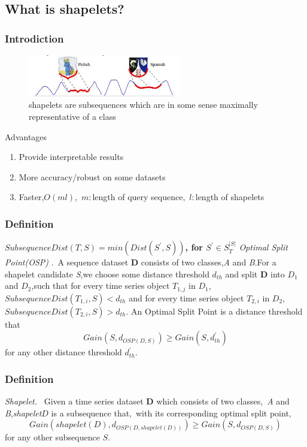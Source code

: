 \documentclass[xetex,mathserif,serif]{beamer}
\begin{document}
\subsection{What is shapelets?}
\begin{frame}
\frametitle{Introdiction}
\begin{figure}
  \centering
  \includegraphics[width=0.6\textwidth]{shapelets.png}
  \caption{\centering shapelets are subsequences which are in some sense maximally representative of a class}\label{fig:9}
\end{figure}
\begin{block}{Advantages}
\begin{enumerate}
  \item Provide interpretable results
  \item More accuracy/robust on some datasets
  \item Faster,$O(ml)$,\ $m:$length of query sequence,\ $l:$length of shapelets
\end{enumerate}
\end{block}
\end{frame}

\begin{frame}
\frametitle{Definition}
\textbf{$SubsequenceDist(T,S) ={min}({Dist}(S^{'},S))$, for $S^{'} \in S_T^{\left| S \right|}$}
\newline
\newline
\emph{Optimal Split Point(OSP) }.\ A sequence dataset \textbf{D} consists of two classes,\emph{A} and \emph{B}.For a shapelet candidate \emph{S},we choose some distance threshold $d_{th}$ and split \textbf{D} into \textbf{$D_1$} and \textbf{$D_2$},such that for every time series object $T_{1,j}$ in \textbf{$D_1$},$SubsequenceDist(T_{1,i},S)<d_{th}$ and for every time series object $T_{2,i}$ in \textbf{$D_2$},$SubsequenceDist(T_{2,i},S)>d_{th}$. An Optimal Split Point is a distance threshold that
\[{Gain}\left( {S,{d_{{OSP}\left( {D,S} \right)}}} \right) \ge {Gain}\left( {S,d_{th}^{'}} \right)\]
for any other distance threshold $d_{th}^{'}$.
\end{frame}

\begin{frame}
\frametitle{Definition}
\emph{Shapelet. }\ Given a time series dataset \textbf{D} which consists of two classes,\ \emph{A} and \emph{B},\emph{shapelet}\textbf{$D$} is a subsequence that,\ with its corresponding optimal split point,
\[Gain\left( {shapelet\left( D \right),{d_{OSP\left( {D,shapelet\left( D \right)} \right)}}} \right) \ge Gain\left( {S,{d_{OSP\left( {D,S} \right)}}} \right)\]
for any other subsequence \textbf{$S$}.
\end{frame}
\end{document}
